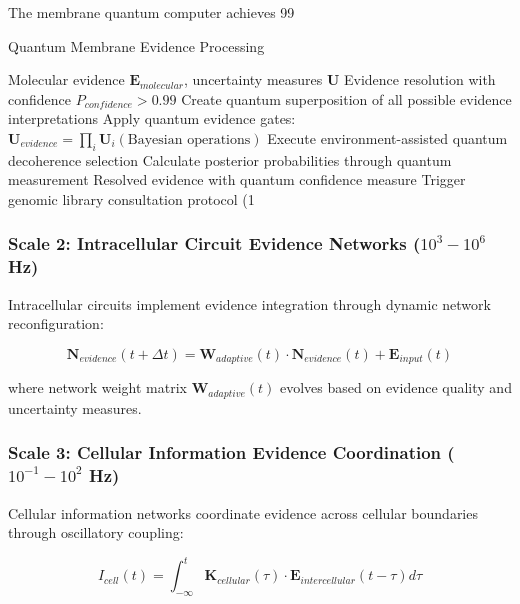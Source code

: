\documentclass[12pt,a4paper]{article}
\begin{document}
The membrane quantum computer achieves 99%

\begin{algorithm}
\caption{Quantum Membrane Evidence Processing}
\begin{algorithmic}[1]
\REQUIRE Molecular evidence $\mathbf{E}_{molecular}$, uncertainty measures $\mathbf{U}$
\ENSURE Evidence resolution with confidence $P_{confidence} > 0.99$
\STATE Create quantum superposition of all possible evidence interpretations
\STATE Apply quantum evidence gates: $\mathbf{U}_{evidence} = \prod_i \mathbf{U}_i(\text{Bayesian operations})$
\STATE Execute environment-assisted quantum decoherence selection
\STATE Calculate posterior probabilities through quantum measurement
    \RETURN Resolved evidence with quantum confidence measure
\ELSE
    \STATE Trigger genomic library consultation protocol (1%
\ENDIF
\end{algorithmic}
\end{algorithm}

\subsubsection{Scale 2: Intracellular Circuit Evidence Networks ($10^3-10^6$ Hz)}

Intracellular circuits implement evidence integration through dynamic network reconfiguration:

\begin{equation}
\mathbf{N}_{evidence}(t+\Delta t) = \mathbf{W}_{adaptive}(t) \cdot \mathbf{N}_{evidence}(t) + \mathbf{E}_{input}(t)
\end{equation}

where network weight matrix $\mathbf{W}_{adaptive}(t)$ evolves based on evidence quality and uncertainty measures.

\subsubsection{Scale 3: Cellular Information Evidence Coordination ($10^{-1}-10^2$ Hz)}

Cellular information networks coordinate evidence across cellular boundaries through oscillatory coupling:

\begin{equation}
I_{cell}(t) = \int_{-\infty}^{t} \mathbf{K}_{cellular}(\tau) \cdot \mathbf{E}_{intercellular}(t-\tau) d\tau
\end{equation}
\end{document}
